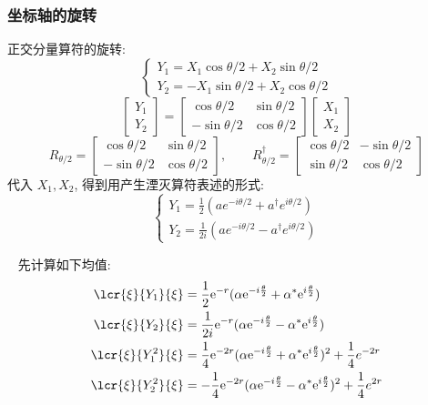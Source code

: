 \begin{frame}  
    \frametitle{坐标轴的旋转}
    正交分量算符的旋转:    
    $$\left\{\begin{matrix}
        Y_1=X_1\cos\theta /2 +X_2\sin\theta /2\\
        Y_2=-X_1\sin\theta /2 +X_2\cos\theta /2
    \end{matrix}\right.$$
    $$\begin{bmatrix}
        Y_1 \\
        Y_2
    \end{bmatrix}
    =
    \begin{bmatrix}
        \cos\theta /2 & \sin\theta /2\\
        -\sin\theta /2 & \cos\theta /2
    \end{bmatrix}
    \begin{bmatrix}
        X_1 \\
        X_2
    \end{bmatrix}$$
    $$ R_{\theta /2}=
    \begin{bmatrix}
        \cos\theta  /2 &\sin\theta /2\\
        -\sin\theta /2 &\cos\theta /2
    \end{bmatrix} ,\qquad
    R_{\theta  /2} ^{\dagger}=
    \begin{bmatrix}
        \cos\theta /2 & -\sin\theta /2\\
        \sin\theta /2 &\cos\theta /2
    \end{bmatrix} $$
    代入 $X_1, X_2$, 得到用产生湮灭算符表述的形式: 
    $$\left\{\begin{matrix}
        Y_1=\frac{1}{2}(a e^{-i \theta /2 }+a^\dagger e^{i \theta /2 })\\
        Y_2=\frac{1}{2i}(a e^{-i \theta /2 }-a^\dagger e^{i \theta /2 })
    \end{matrix}\right.$$
   \[ \]
\end{frame}

\begin{frame}
  \解~ 先计算如下均值: 
  \[ \begin{aligned}
    \lcr{\xi}{Y_1 }{\xi} &= \frac{1}{2} \mathrm{e}^{-r} (\alpha \mathrm{e}^{-i\frac{\theta}{2}}+ \alpha^* \mathrm{e}^{i\frac{\theta}{2}})   \\ 
    \lcr{\xi}{Y_2 }{\xi} &= \frac{1}{2i} \mathrm{e}^{-r} (\alpha \mathrm{e}^{-i\frac{\theta}{2}}- \alpha^* \mathrm{e}^{i\frac{\theta}{2}})   \\ 
    \lcr{\xi}{Y_1 ^2 }{\xi} &=  \frac{1}{4} \mathrm{e}^{-2r} (\alpha \mathrm{e}^{-i\frac{\theta}{2}}+ \alpha^* \mathrm{e}^{i\frac{\theta}{2}})^2 +  \frac{1}{4} e^{-2r}  \\ 
    \lcr{\xi}{Y_2 ^2 }{\xi} &= -\frac{1}{4} \mathrm{e}^{-2r} (\alpha \mathrm{e}^{-i\frac{\theta}{2}}- \alpha^* \mathrm{e}^{i\frac{\theta}{2}})^2  +  \frac{1}{4} e^{ 2r}  \\ 
\end{aligned}\]

\end{frame}

